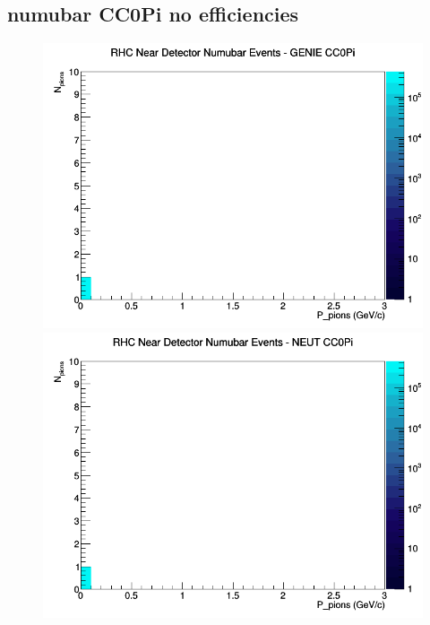 \documentclass[12pt]{article}
\begin{document}
\subsection{numubar CC0Pi no efficiencies}
\begin{figure}[h]
\includegraphics[width=\linewidth]{N_P/nominal/pions/CC0Pi_RHC_ND_numubar_N_P_GENIE.png}
\endminipage
{}
\includegraphics[width=\linewidth]{N_P/nominal/pions/CC0Pi_RHC_ND_numubar_N_P_NEUT.png}
\endminipage
{}

\end{figure}
\end{document}
